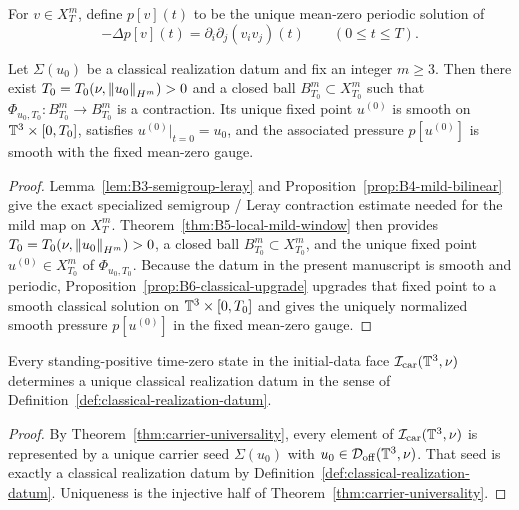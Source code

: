 \begin{definition}\label{def:pressure-reconstruction-operator}
For $v\in X_T^m$, define $p[v](t)$ to be the unique mean-zero periodic solution of
\[
-\Delta p[v](t)=\partial_i\partial_j(v_i v_j)(t)
\qquad (0\le t\le T).
\]
\end{definition}

\begin{lemma}\label{lem:constructive-local-window}
Let $\Sigma(u_0)$ be a classical realization datum and fix an integer $m\ge 3$.
Then there exist $T_0=T_0(\nu,\left\lVert u_0\right\rVert_{H^m})>0$ and a closed ball
$B_{T_0}^m\subset X_{T_0}^m$ such that $\Phi_{u_0,T_0}:B_{T_0}^m\to B_{T_0}^m$ is a contraction.
Its unique fixed point $u^{(0)}$ is smooth on $\mathbb{T}^3\times[0,T_0]$, satisfies $u^{(0)}|_{t=0}=u_0$,
and the associated pressure $p[u^{(0)}]$ is smooth with the fixed mean-zero gauge.
\end{lemma}

\begin{proof}
Lemma~\ref{lem:B3-semigroup-leray} and Proposition~\ref{prop:B4-mild-bilinear} give the exact
specialized semigroup / Leray contraction estimate needed for the mild map on $X_T^m$. Theorem~\ref{thm:B5-local-mild-window}
then provides $T_0=T_0(\nu,\left\lVert u_0\right\rVert_{H^m})>0$, a closed ball $B_{T_0}^m\subset X_{T_0}^m$, and the
unique fixed point $u^{(0)}\in X_{T_0}^m$ of $\Phi_{u_0,T_0}$. Because the datum in the present
manuscript is smooth and periodic, Proposition~\ref{prop:B6-classical-upgrade} upgrades that fixed
point to a smooth classical solution on $\mathbb{T}^3\times[0,T_0]$ and gives the uniquely normalized smooth
pressure $p[u^{(0)}]$ in the fixed mean-zero gauge.
\end{proof}

\begin{lemma}\label{lem:initial-data-extraction}
Every standing-positive time-zero state in the initial-data face
$\mathcal I_{\mathrm{car}}(\mathbb{T}^3,\nu)$ determines a unique classical realization datum in the sense of
Definition~\ref{def:classical-realization-datum}.
\end{lemma}

\begin{proof}
By Theorem~\ref{thm:carrier-universality}, every element of
$\mathcal I_{\mathrm{car}}(\mathbb{T}^3,\nu)$ is represented by a unique carrier seed $\Sigma(u_0)$ with
$u_0\in\mathcal D_{\mathrm{off}}(\mathbb{T}^3,\nu)$. That seed is exactly a classical realization datum by
Definition~\ref{def:classical-realization-datum}. Uniqueness is the injective half of
Theorem~\ref{thm:carrier-universality}.
\end{proof}

